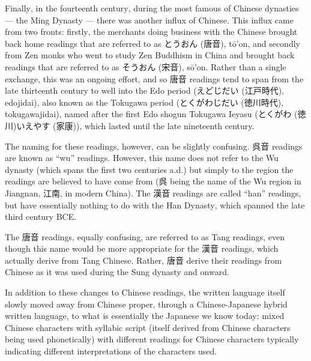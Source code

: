 \documentclass[11pt, b5paper, twoside, openright, onecolumn]{book}
\makeatletter
\newcommand*{\rubystack}[2]{{\relscale{0.5}%
  \begin{tabular}[b]{@{}c@{}}%
    {#1}\\%
   {\textscale{2}{#2}}%
  \end{tabular}}%
}
\DeclareRobustCommand*{\ruby}[2]{%
  \mbox{%
    \setlength{\parskip}{0ex}%
    \BeginAccSupp{method=pdfstringdef,ActualText={#1}}%
      \rubystack{\phantom{#2}}{#1}%
      \llap{%
        \rubystack{#2}{\phantom{#1}}%
      }%
    \EndAccSupp{}%
  }%
}
\renewcommand*{\ruby}[2]{#2 (#1)}%
\makeatother
\begin{document}
Finally‚ in the fourteenth century‚ during the most famous of Chinese dynasties — the Ming Dynasty — there was another influx of Chinese. This influx came from two fronts: firstly‚ the merchants doing business with the Chinese brought back home readings that are referred to as \ruby{唐音}{とうおん}‚ tō’on‚ and secondly from Zen monks who went to study Zen Buddhism in China and brought back readings that are referred to as \ruby{宋音}{そうおん}‚ sō’on. Rather than a single exchange‚ this was an ongoing effort‚ and so 唐音 readings tend to span from the late thirteenth century to well into the Edo period (\ruby{江戸時代}{えどじだい}‚ edojidai)‚ also known as the Tokugawa period (\ruby{徳川時代}{とくがわじだい}‚ tokugawajidai)‚ named after the first Edo shogun Tokugawa Ieyasu (\ruby{徳川}{とくがわ}\ruby{家康}{いえやす})‚ which lasted until the late nineteenth century.

The naming for these readings‚ however‚ can be slightly confusing. 呉音 readings are known as “wu” readings. However‚ this name does not refer to the Wu dynasty (which spans the first two centuries a.d.) but simply to the region the readings are believed to have come from (呉 being the name of the Wu region in Jiangnan‚ 江南‚ in modern China). The 漢音 readings are called “han” readings‚ but have essentially nothing to do with the Han Dynasty‚ which spanned the late third century BCE.

The 唐音 readings‚ equally confusing‚ are referred to as Tang readings‚ even though this name would be more appropriate for the 漢音 readings‚ which actually derive from Tang Chinese. Rather‚ 唐音 derive their readings from Chinese as it was used during the Sung dynasty and onward.

In addition to these changes to Chinese readings‚ the written language itself slowly moved away from Chinese proper‚ through a Chinese-Japanese hybrid written language‚ to what is essentially the Japanese we know today: mixed Chinese characters with syllabic script (itself derived from Chinese characters being used phonetically) with different readings for Chinese characters typically indicating different interpretations of the characters used.
\end{document}
